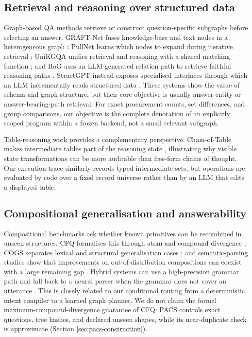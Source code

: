 \subsection{Retrieval and reasoning over structured data}

Graph-based QA methods retrieve or construct question-specific subgraphs before selecting an
answer.  GRAFT-Net fuses knowledge-base and text nodes in a heterogeneous graph
\citep{sun-etal-2018-open}; PullNet learns which nodes to expand during iterative retrieval
\citep{sun-etal-2019-pullnet}; UniKGQA unifies retrieval and reasoning with a shared matching
function \citep{jiang2023unikgqa}; and RoG uses an LLM-generated relation path to retrieve
faithful reasoning paths \citep{luo2024rog}.  StructGPT instead exposes specialised interfaces
through which an LLM incrementally reads structured data \citep{jiang-etal-2023-structgpt}.
These systems show the value of schema and graph structure, but their core objective is usually
answer-entity or answer-bearing-path retrieval.  For exact procurement counts, set differences,
and group comparisons, our objective is the complete denotation of an explicitly scoped program
within a frozen backend, not a small relevant subgraph.

Table-reasoning work provides a complementary perspective.  Chain-of-Table makes intermediate
tables part of the reasoning state \citep{wang2024chainoftable}, illustrating why visible state
transformations can be more auditable than free-form chains of thought.  Our execution trace
similarly records typed intermediate sets, but operations are evaluated by code over a fixed
record universe rather than by an LLM that edits a displayed table.

\subsection{Compositional generalisation and answerability}

Compositional benchmarks ask whether known primitives can be recombined in unseen structures.
CFQ formalises this through atom and compound divergence \citep{keysers2020cfq}; COGS separates
lexical and structural generalisation cases \citep{kim-linzen-2020-cogs}; and semantic-parsing
studies show that improvements on out-of-distribution compositions can coexist with a large
remaining gap \citep{oren-etal-2020-compositional}.  Hybrid systems can use a high-precision
grammar path and fall back to a neural parser when the grammar does not cover an utterance
\citep{shaw-etal-2021-compositional}.  This is closely related to our conditional routing from a
deterministic intent compiler to a learned graph planner.  We do not claim the formal
maximum-compound-divergence guarantee of CFQ: PACS controls exact questions, tree hashes, and
declared unseen shapes, while its near-duplicate check is approximate (Section
\ref{sec:pacs-construction}).

